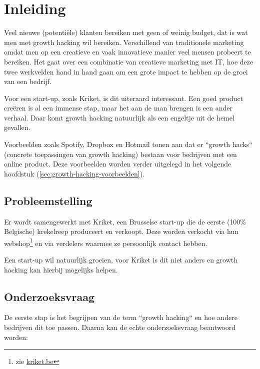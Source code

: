 
\chapter{Inleiding}
\label{ch:inleiding}

Veel nieuwe (potentiële) klanten bereiken met geen of weinig budget, dat is wat men met growth hacking wil bereiken. Verschillend van traditionele marketing omdat men op een creatieve en vaak innovatieve manier veel mensen probeert te bereiken. Het gaat over een combinatie van creatieve marketing met IT, hoe deze twee werkvelden hand in hand gaan om een grote impact te hebben op de groei van een bedrijf.

Voor een start-up, zoals Kriket, is dit uiteraard interessant. Een goed product creëren is al een immense stap, maar het aan de man brengen is een ander verhaal. Daar komt growth hacking natuurlijk als een engeltje uit de hemel gevallen. 

Voorbeelden zoals Spotify, Dropbox en Hotmail tonen aan dat er ``growth hacks`` (concrete toepassingen van growth hacking) bestaan voor bedrijven met een online product. Deze voorbeelden worden verder uitgelegd in het volgende hoofdstuk (\ref{sec:growth-hacking-voorbeelden}).

\section{Probleemstelling}
\label{sec:probleemstelling}

Er wordt samengewerkt met Kriket, een Brusselse start-up die de eerste (100\% Belgische) krekelreep produceert en verkoopt. Deze worden verkocht via hun webshop\footnote{zie \href{https://kriket.be}{kriket.be}} en via verdelers waarmee ze persoonlijk contact hebben.

Een start-up wil natuurlijk groeien, voor Kriket is dit niet anders en growth hacking kan hierbij mogelijks helpen.

\section{Onderzoeksvraag}
\label{sec:onderzoeksvraag}

De eerste stap is het begrijpen van de term ``growth hacking`` en hoe andere bedrijven dit toe passen. Daarna kan de echte onderzoeksvraag beantwoord worden:

